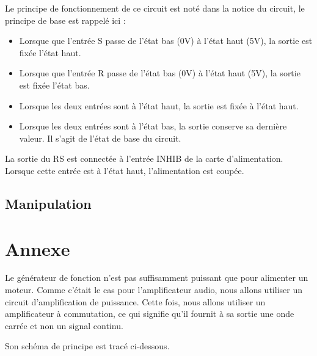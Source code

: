 \documentclass{../template/tp}
\begin{document}
Le principe de fonctionnement de ce circuit est noté dans la notice du circuit, le principe de base est
rappelé ici :

\begin{itemize}
    \item Lorsque que l'entrée S passe de l'état bas (0V) à l'état haut (5V), la sortie est fixée l'état haut.
    \item Lorsque que l'entrée R passe de l'état bas (0V) à l'état haut (5V), la sortie est fixée l'état bas.
    \item Lorsque les deux entrées sont à l'état haut, la sortie est fixée à l'état haut.
    \item Lorsque les deux entrées sont à l'état bas, la sortie conserve sa dernière valeur. Il s'agit de l'état de base du circuit.
\end{itemize}

La sortie du RS est connectée à l'entrée INHIB de la carte d'alimentation. Lorsque cette entrée est à
l'état haut, l'alimentation est coupée.

\subsection{Manipulation}






\section{Annexe}
Le générateur de fonction n'est pas suffisamment puissant que pour alimenter un moteur. Comme c'était le cas
pour l'amplificateur audio, nous allons utiliser un circuit d'amplification de puissance.
Cette fois, nous allons utiliser un amplificateur à commutation, ce qui signifie qu'il fournit à sa sortie une onde
carrée et non un signal continu.


Son schéma de principe est tracé ci-dessous.
\end{document}
